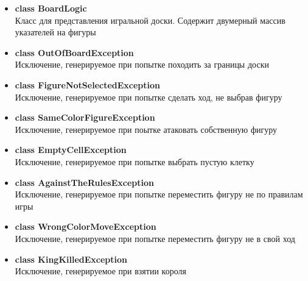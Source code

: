 \begin{itemize}
\item\textbf{class BoardLogic}\\
Класс для представления игральной доски. Содержит двумерный массив указателей на фигуры\\
\item\textbf{class OutOfBoardException}\\
Исключение, генерируемое при попытке походить за границы доски\\
\item\textbf{class FigureNotSelectedException}\\
Исключение, генерируемое при попытке сделать ход, не выбрав фигуру\\
\item\textbf{class SameColorFigureException}\\
Исключение, генерируемое при поытке атаковать собственную фигуру\\
\item\textbf{class EmptyCellException}\\
Исключение, генерируемое при попытке выбрать пустую клетку\\
\item\textbf{class AgainstTheRulesException}\\
Исключение, генерируемое при попытке переместить фигуру не по правилам игры\\
\item\textbf{class WrongColorMoveException}\\
Исключение, генерируемое при попытке переместить фигуру не в свой ход\\
\item\textbf{class KingKilledException}\\
Исключение, генерируемое при взятии короля\\
\end{itemize}

